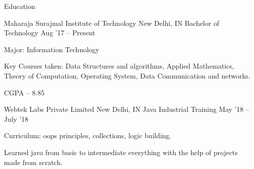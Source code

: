 \documentclass{resume} %
\begin{document}




\begin{rSection}{Education}
  \begin{rEducationSection}{Maharaja Surajmal Institute of Technology}
                           {New Delhi, IN}
                           {Bachelor of Technology}
                           {Aug '17 -- Present}
{
  \item Major: Information Technology
  \item Key Courses taken: Data Structures and algorithms, Applied Mathematics, Theory of Computation, Operating System, Data Communication and networks.
  \item CGPA -- 8.85
   }                                         
  \end{rEducationSection}
  
  \begin{rEducationSection}{Webtek Labs Private Limited}
                            {New Delhi, IN}
                           {Java Industrial Training}
                           {May '18 -- July '18}
 {
  \item Curriculum: oops principles, collections, logic building.
  \item Learned java from basic to intermediate everything with the help of projects made from scratch.
   }                                         
  \end{rEducationSection}
  
\end{rSection}

\end{document}
